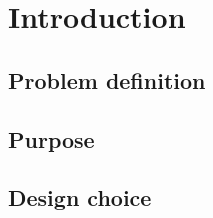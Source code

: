 \chapter{Introduction}
\label{chap:Introduction}

\section{Problem definition}

\section{Purpose}

\section{Design choice}
